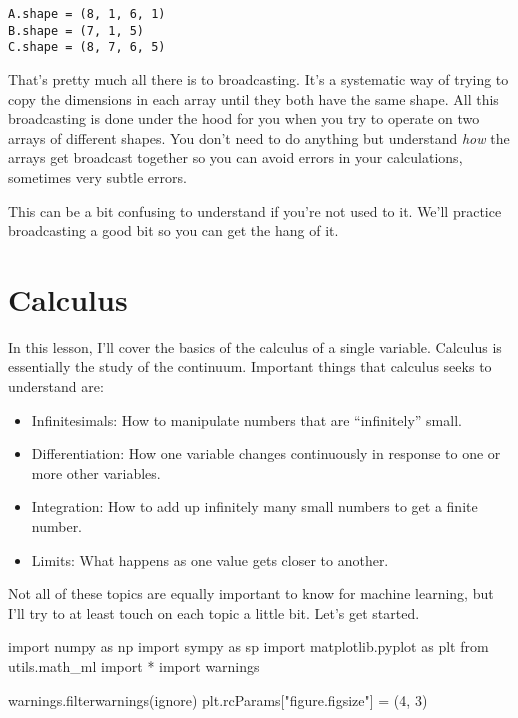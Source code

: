 \documentclass[
  letterpaper,
  DIV=11,
  numbers=noendperiod]{scrreprt}
\newenvironment{Shaded}{\begin{snugshade}}{\end{snugshade}}
\newcommand{\DecValTok}[1]{\textcolor[rgb]{0.68,0.00,0.00}{#1}}
\newcommand{\ImportTok}[1]{\textcolor[rgb]{0.00,0.46,0.62}{#1}}
\newcommand{\NormalTok}[1]{\textcolor[rgb]{0.00,0.23,0.31}{#1}}
\newcommand{\OperatorTok}[1]{\textcolor[rgb]{0.37,0.37,0.37}{#1}}
\newcommand{\StringTok}[1]{\textcolor[rgb]{0.13,0.47,0.30}{#1}}
\providecommand{\tightlist}{%
  \setlength{\itemsep}{0pt}\setlength{\parskip}{0pt}}\usepackage{longtable,booktabs,array}
\begin{document}
\begin{verbatim}
A.shape = (8, 1, 6, 1)
B.shape = (7, 1, 5)
C.shape = (8, 7, 6, 5)
\end{verbatim}

That's pretty much all there is to broadcasting. It's a systematic way
of trying to copy the dimensions in each array until they both have the
same shape. All this broadcasting is done under the hood for you when
you try to operate on two arrays of different shapes. You don't need to
do anything but understand \emph{how} the arrays get broadcast together
so you can avoid errors in your calculations, sometimes very subtle
errors.

This can be a bit confusing to understand if you're not used to it.
We'll practice broadcasting a good bit so you can get the hang of it.


\hypertarget{calculus}{%
\chapter{Calculus}\label{calculus}}

In this lesson, I'll cover the basics of the calculus of a single
variable. Calculus is essentially the study of the continuum. Important
things that calculus seeks to understand are:

\begin{itemize}
\tightlist
\item
  Infinitesimals: How to manipulate numbers that are ``infinitely''
  small.
\item
  Differentiation: How one variable changes continuously in response to
  one or more other variables.
\item
  Integration: How to add up infinitely many small numbers to get a
  finite number.
\item
  Limits: What happens as one value gets closer to another.
\end{itemize}

Not all of these topics are equally important to know for machine
learning, but I'll try to at least touch on each topic a little bit.
Let's get started.

\begin{Shaded}
\begin{Highlighting}[]
\ImportTok{import}\NormalTok{ numpy }\ImportTok{as}\NormalTok{ np}
\ImportTok{import}\NormalTok{ sympy }\ImportTok{as}\NormalTok{ sp}
\ImportTok{import}\NormalTok{ matplotlib.pyplot }\ImportTok{as}\NormalTok{ plt}
\ImportTok{from}\NormalTok{ utils.math\_ml }\ImportTok{import} \OperatorTok{*}
\ImportTok{import}\NormalTok{ warnings}

\NormalTok{warnings.filterwarnings(}\StringTok{\textquotesingle{}ignore\textquotesingle{}}\NormalTok{)}
\NormalTok{plt.rcParams[}\StringTok{"figure.figsize"}\NormalTok{] }\OperatorTok{=}\NormalTok{ (}\DecValTok{4}\NormalTok{, }\DecValTok{3}\NormalTok{)}
\end{Highlighting}
\end{Shaded}
\end{document}
